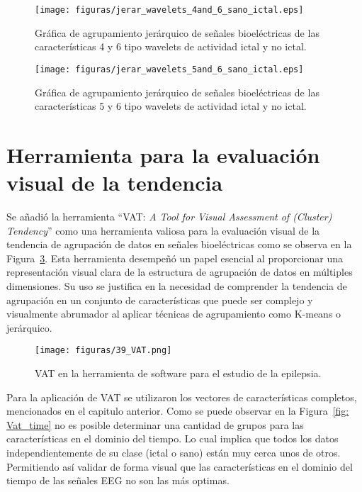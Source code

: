\begin{figure}[H]
    \centering
    \texttt{[image: figuras/jerar\_wavelets\_4and\_6\_sano\_ictal.eps]}
    \caption{Gráfica de agrupamiento jerárquico de señales bioeléctricas de las características 4 y 6 tipo wavelets de actividad ictal y no ictal.}
    \label{fig: jerar_wave_4_6}
\end{figure}
\begin{figure}[H]
    \centering
    \texttt{[image: figuras/jerar\_wavelets\_5and\_6\_sano\_ictal.eps]}
    \caption{Gráfica de agrupamiento jerárquico de señales bioeléctricas de las características 5 y 6 tipo wavelets de actividad ictal y no ictal.}
    \label{fig: jerar_wave_5_6}
\end{figure}

\section{Herramienta para la evaluación visual de la tendencia}
Se añadió la herramienta ``VAT: \textit{ A Tool for Visual Assessment of (Cluster) Tendency}'' como una herramienta valiosa para la evaluación visual de la tendencia de agrupación de datos en señales bioeléctricas como se observa en la Figura~\ref{fig: Vat_toolbox}. Esta herramienta desempeñó un papel esencial al proporcionar una representación visual clara de la estructura de agrupación de datos en múltiples dimensiones. Su uso se justifica en la necesidad de comprender la tendencia de agrupación en un conjunto de características que puede ser complejo y visualmente abrumador al aplicar técnicas de agrupamiento como K-means o jerárquico.

\begin{figure}[H]
	\centering
	\texttt{[image: figuras/39\_VAT.png]}
	\caption{VAT en la herramienta de software para el estudio de la epilepsia.}
	\label{fig: Vat_toolbox}
\end{figure}

Para la aplicación de VAT se utilizaron los vectores de características completos, mencionados en el capitulo anterior. 
Como se puede observar en la Figura~\ref{fig: Vat_time} no es posible determinar una cantidad de grupos para las características en el dominio del tiempo. Lo cual implica que todos los datos independientemente de su clase (ictal o sano) están muy cerca unos de otros. Permitiendo así validar de forma visual que las características en el dominio del tiempo de las señales EEG no son las más optimas. 

